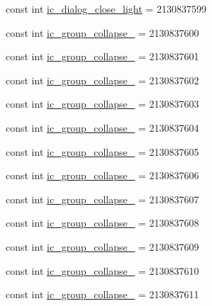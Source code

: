 \begin{DoxyCompactItemize}
const int \mbox{\hyperlink{class_f_w_p_s___app_1_1_droid_1_1_resource_1_1_drawable_a3956b9182b1c6dc9cdd21b48eac02de9}{ic\+\_\+dialog\+\_\+close\+\_\+light}} = 2130837599
\item 
const int \mbox{\hyperlink{class_f_w_p_s___app_1_1_droid_1_1_resource_1_1_drawable_ac547b4ea22236700324b137f79db3ca6}{ic\+\_\+group\+\_\+collapse\+\_}} = 2130837600
\item 
const int \mbox{\hyperlink{class_f_w_p_s___app_1_1_droid_1_1_resource_1_1_drawable_a70030f399204306668eb5872547f8452}{ic\+\_\+group\+\_\+collapse\+\_}} = 2130837601
\item 
const int \mbox{\hyperlink{class_f_w_p_s___app_1_1_droid_1_1_resource_1_1_drawable_a563ea5219324f8b8f3255c80b8540899}{ic\+\_\+group\+\_\+collapse\+\_}} = 2130837602
\item 
const int \mbox{\hyperlink{class_f_w_p_s___app_1_1_droid_1_1_resource_1_1_drawable_aa5c54397ddf8e58d3d0dc001434a4170}{ic\+\_\+group\+\_\+collapse\+\_}} = 2130837603
\item 
const int \mbox{\hyperlink{class_f_w_p_s___app_1_1_droid_1_1_resource_1_1_drawable_ac19ab0a41217ef4eac1ae18b69e1aa7e}{ic\+\_\+group\+\_\+collapse\+\_}} = 2130837604
\item 
const int \mbox{\hyperlink{class_f_w_p_s___app_1_1_droid_1_1_resource_1_1_drawable_a0624f9986463459c6c9238bf68cba2ed}{ic\+\_\+group\+\_\+collapse\+\_}} = 2130837605
\item 
const int \mbox{\hyperlink{class_f_w_p_s___app_1_1_droid_1_1_resource_1_1_drawable_a3b99b651e92d4ed350791808d4e76217}{ic\+\_\+group\+\_\+collapse\+\_}} = 2130837606
\item 
const int \mbox{\hyperlink{class_f_w_p_s___app_1_1_droid_1_1_resource_1_1_drawable_ad31035c90dc0780e79521b579f7278e6}{ic\+\_\+group\+\_\+collapse\+\_}} = 2130837607
\item 
const int \mbox{\hyperlink{class_f_w_p_s___app_1_1_droid_1_1_resource_1_1_drawable_a0ec5f5c104a4f547414084be40a1eb04}{ic\+\_\+group\+\_\+collapse\+\_}} = 2130837608
\item 
const int \mbox{\hyperlink{class_f_w_p_s___app_1_1_droid_1_1_resource_1_1_drawable_a7a751845ca03654ad59cc525a1f965b5}{ic\+\_\+group\+\_\+collapse\+\_}} = 2130837609
\item 
const int \mbox{\hyperlink{class_f_w_p_s___app_1_1_droid_1_1_resource_1_1_drawable_a99445704d49e75a0278b112828c93e0b}{ic\+\_\+group\+\_\+collapse\+\_}} = 2130837610
\item 
const int \mbox{\hyperlink{class_f_w_p_s___app_1_1_droid_1_1_resource_1_1_drawable_af1b93ff9507ea4cfbf553c02fa96f110}{ic\+\_\+group\+\_\+collapse\+\_}} = 2130837611

\end{DoxyCompactItemize}
